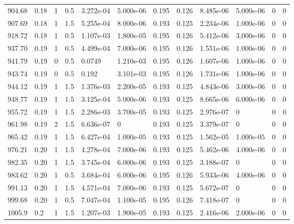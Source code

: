 \documentclass[preview]{standalone}
\begin{document}
{{{\begin{tabular}{L{1.2cm}C{1.2cm} C{0.3cm}C{0.5cm} C{1.4cm}C{1.4cm} C{1.4cm}C{1.4cm} C{1.6cm}C{1.6cm} C{1.6cm}C{1.6cm}}
  904.68  &  0.18  & 1     & 0.5 &  3.272e-04  & 5.000e-06  &  0.195&   0.126& 8.485e-06 & 5.000e-06   &  0 & 0  \\ 
  907.69  &  0.18  & 1     & 1.5 &  5.255e-04  & 8.000e-06  &  0.193&   0.125& 2.234e-06 & 1.000e-06   &  0 & 0  \\ 
  918.72  &  0.18  & 1     & 0.5 &  1.107e-03  & 1.800e-05  &  0.195&   0.126& 5.412e-06 & 3.000e-06   &  0 & 0  \\ 
  937.70  &  0.19  & 1     & 0.5 &  4.499e-04  & 7.000e-06  &  0.195&   0.126& 1.551e-06 & 1.000e-06   &  0 & 0  \\ 
  941.79  &  0.19  & 0     & 0.5 &  0.0749  & 1.210e-03  &  0.195&   0.126& 1.607e-06 & 1.000e-06   &  0 & 0  \\ 
  943.74  &  0.19  & 0     & 0.5 &  0.192  & 3.101e-03  &  0.195&   0.126& 1.731e-06 & 1.000e-06   &  0 & 0  \\ 
  944.12  &  0.19  & 1     & 1.5 &  1.376e-03  & 2.200e-05  &  0.193&   0.125& 4.843e-06 & 3.000e-06   &  0 & 0  \\ 
  948.77  &  0.19  & 1     & 1.5 &  3.125e-04  & 5.000e-06  &  0.193&   0.125& 8.665e-06 & 6.000e-06   &  0 & 0  \\ 
  955.72  &  0.19  & 1     & 1.5 &  2.286e-03  & 3.700e-05  &  0.193&   0.125& 2.976e-07 & 0   &  0 & 0  \\ 
  961.98  &  0.19  & 2     & 1.5 &  6.636e-07  & 0  &  0.193&   0.125& 3.379e-07 & 0   &  0 & 0  \\ 
  965.42  &  0.19  & 1     & 1.5 &  6.427e-04  & 1.000e-05  &  0.193&   0.125& 1.562e-05 & 1.000e-05   &  0 & 0  \\ 
  976.21  &  0.20  & 1     & 1.5 &  4.278e-04  & 7.000e-06  &  0.193&   0.125& 5.462e-06 & 4.000e-06   &  0 & 0  \\ 
  982.35  &  0.20  & 1     & 1.5 &  3.745e-04  & 6.000e-06  &  0.193&   0.125& 3.188e-07 & 0   &  0 & 0  \\ 
  983.62  &  0.20  & 1     & 0.5 &  3.684e-04  & 6.000e-06  &  0.195&   0.126& 5.933e-06 & 4.000e-06   &  0 & 0  \\ 
  991.13  &  0.20  & 1     & 1.5 &  4.571e-04  & 7.000e-06  &  0.193&   0.125& 5.672e-07 & 0   &  0 & 0  \\ 
  999.68  &  0.20  & 1     & 0.5 &  7.047e-04  & 1.100e-05  &  0.195&   0.126& 7.418e-07 & 0   &  0 & 0  \\ 
  1005.9  &   0.2  & 1     & 1.5 &  1.207e-03  & 1.900e-05  &  0.193&   0.125& 2.416e-06 & 2.000e-06   &  0 & 0  \\ 

\end{tabular}}}}
\end{document}
